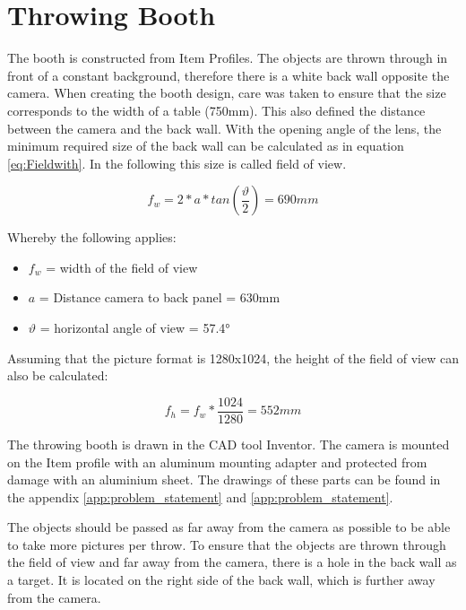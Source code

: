\section{Throwing Booth}
\label{sec:booth} 
The booth is constructed from Item Profiles.
The objects are thrown through in front of a constant background, therefore there is a white back wall opposite the camera.
When creating the booth design, care was taken to ensure that the size corresponds to the width of a table (750mm).
This also defined the distance between the camera and the back wall.
With the opening angle of the lens, the minimum required size of the back wall can be calculated as in equation \ref{eq:Fieldwith}. 
In the following this size is called field of view.

\begin{equation}
	f_w = 2*a*tan\left( \frac{\vartheta}{2}\right) = 690mm
	\label{eq:Fieldwith}
\end{equation}

Whereby the following applies:
\begin{itemize}
	\item $f_w$ = width of the field of view
	\item $a$ = Distance camera to back panel = 630mm
	\item $\vartheta$ = horizontal angle of view = 57.4° \cite{BaumerLense}
\end{itemize}

Assuming that the picture format is 1280x1024, the height of the field of view can also be calculated:

\begin{equation}
	f_h = f_w*\frac{1024}{1280} = 552mm
	\label{eq:Fieldhight}
\end{equation}


The throwing booth is drawn in the CAD tool Inventor.
The camera is mounted on the Item profile with an aluminum mounting adapter and protected from damage with an aluminium sheet.
The drawings of these parts can be found in the appendix \ref{app:problem_statement} and \ref{app:problem_statement}. 

The objects should be passed as far away from the camera as possible to be able to take more pictures per throw.
To ensure that the objects are thrown through the field of view and far away from the camera, there is a hole in the back wall as a target.
It is located on the right side of the back wall, which is further away from the camera.


